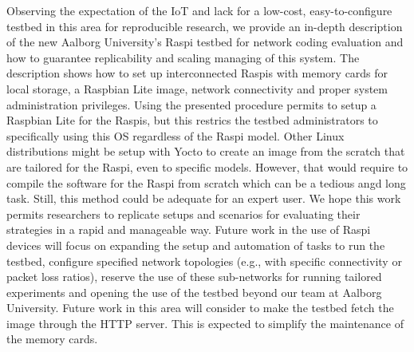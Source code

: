 \label{sec:conclusions}
Observing the expectation of the \ac{IoT} and lack for a low-cost, easy-to-configure testbed in this area for reproducible research, we provide an in-depth description of the new Aalborg University's \ac{Raspi} testbed for network coding evaluation and how to guarantee replicability and scaling managing of this system. The description shows how to set up interconnected \ac{Raspi}s with memory cards for local storage, a Raspbian Lite image, network connectivity and proper system administration privileges. Using the presented procedure permits to setup a Raspbian Lite for the \ac{Raspi}s, but this restrics the testbed administrators to specifically using this \ac{OS} regardless of the \ac{Raspi} model. Other Linux distributions might be setup with Yocto to create an image from the scratch that are tailored for the \ac{Raspi}, even to specific models. However, that would require to compile the software for the \ac{Raspi} from scratch which can be a tedious angd long task. Still, this method could be adequate for an expert user. We hope this work permits researchers to replicate setups and scenarios for evaluating their strategies in a rapid and manageable way. Future work in the use of \ac{Raspi} devices will focus on expanding the setup and automation of tasks to run the testbed, configure specified network topologies (e.g., with specific connectivity or packet loss ratios), reserve the use of these sub-networks for running tailored experiments and opening the use of the testbed beyond our team at Aalborg University. Future work in this area will consider to make the testbed fetch the image through the \ac{HTTP} server. This is expected to simplify the maintenance of the memory cards.
